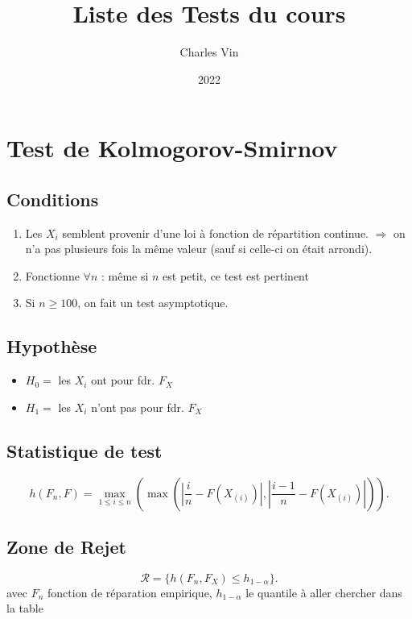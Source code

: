 \documentclass{article}
\title{Liste des Tests du cours}
\author{Charles Vin}
\date{2022}
\theoremstyle{plain}%
\theoremstyle{definition}
\theoremstyle{remark}
\begin{document}
\maketitle
\tableofcontents

\section{Test de Kolmogorov-Smirnov}
\subsection*{Conditions}
\begin{enumerate}
    \item Les $ X_i $ semblent provenir d'une loi à fonction de répartition continue. $ \Rightarrow  $ on n'a pas plusieurs fois la même valeur (sauf si celle-ci on était arrondi).\\
    \item Fonctionne $ \forall n $ : même si $ n $ est petit, ce test est pertinent
    \item Si $ n \geq 100 $, on fait un test asymptotique.
\end{enumerate}

\subsection*{Hypothèse}
\begin{itemize}
    \item $ H_0 = $ les $ X_i $ ont pour fdr. $ F_X $ 
    \item $ H_1 = $ les $ X_i $ n'ont pas pour fdr. $ F_X $ 
\end{itemize}

\subsection*{Statistique de test} 
\[
    h(F_n, F) = \max _{1 \leq i \leq n} ( \max ( \left| \frac{i}{n} - F(X_{(i)}) \right| , \left| \frac{i-1}{n}- F(X_{(i)}) \right|  ))
.\]

\subsection*{Zone de Rejet}
\[
    \mathcal{R} = \{h(F_n, F_X) \leq h_{1-\alpha }\}
.\]
avec $ F_n $ fonction de réparation empirique, $ h_{1 -\alpha } $ le quantile à aller chercher dans la table 
\end{document}
